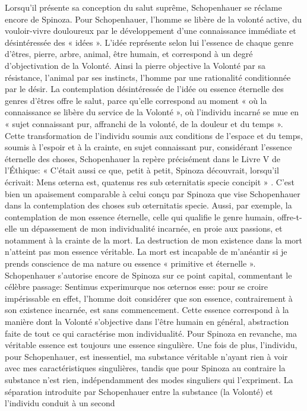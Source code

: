 Lorsqu’il présente sa conception du salut suprême, Schopenhauer se réclame encore de Spinoza. Pour
Schopenhauer, l’homme se libère de la volonté active, du vouloir-vivre douloureux par le développement
d’une connaissance immédiate et désintéressée des « idées ». L’idée représente selon lui l’essence de chaque
genre d’êtres, pierre, arbre, animal, être humain, et correspond à un degré d’objectivation de la Volonté. Ainsi
la pierre objective la Volonté par sa résistance, l’animal par ses instincts, l’homme par une rationalité
conditionnée par le désir. La contemplation désintéressée de l’idée ou essence éternelle des genres d’êtres
offre le salut, parce qu’elle correspond au moment « où la connaissance se libère du service de la Volonté »,
où l’individu incarné se mue en « sujet connaissant pur, affranchi de la volonté, de la douleur et du temps ».
Cette transformation de l’individu soumis aux conditions de l’espace et du temps, soumis à l’espoir et à la
crainte, en sujet connaissant pur, considérant l’essence éternelle des choses, Schopenhauer la repère
précisément dans le Livre V de l’Éthique: « C’était aussi ce que, petit à petit, Spinoza découvrait, lorsqu’il
écrivait: Mens œterna est, quatenus res sub œternitatis specie concipit » . C’est bien un apaisement
comparable à celui conçu par Spinoza que vise Schopenhauer dans la contemplation des choses sub
œternitatis specie.
Aussi, par exemple, la contemplation de mon essence éternelle, celle qui qualifie le genre humain, offre-t-
elle un dépassement de mon individualité incarnée, en proie aux passions, et notamment à la crainte de la
mort. La destruction de mon existence dans la mort n’atteint pas mon essence véritable.
La mort est incapable de m’anéantir si je prends conscience de ma nature ou essence « primitive et
éternelle ». Schopenhauer s’autorise encore de Spinoza sur ce point capital, commentant le célèbre passage:
Sentimus experimurque nos œternos esse: pour se croire impérissable en effet,
l’homme doit considérer que son essence, contrairement à son existence incarnée, est sans commencement.
Cette essence correspond à la manière dont la Volonté s’objective dans l’être humain en
général, abstraction faite de tout ce qui caractérise mon individualité. Pour Spinoza en revanche, ma véritable
essence est toujours une essence singulière. Une fois de plus, l’individu, pour Schopenhauer, est inessentiel,
ma substance véritable n’ayant rien à voir avec mes caractéristiques singulières, tandis que pour Spinoza au
contraire la substance n’est rien, indépendamment des modes singuliers qui l’expriment.
La séparation introduite par Schopenhauer entre la substance (la Volonté) et l’individu conduit à un second
